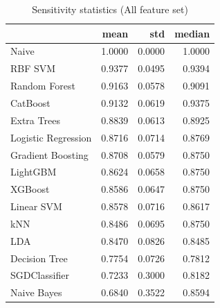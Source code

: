 \begin{table}
\caption{Sensitivity statistics (All feature set)}
\label{tab:sensitivity_All_stats}
\begin{tabular}{lrrr}
\toprule
 & mean & std & median \\
\midrule
Naive & 1.0000 & 0.0000 & 1.0000 \\
RBF SVM & 0.9377 & 0.0495 & 0.9394 \\
Random Forest & 0.9163 & 0.0578 & 0.9091 \\
CatBoost & 0.9132 & 0.0619 & 0.9375 \\
Extra Trees & 0.8839 & 0.0613 & 0.8925 \\
Logistic Regression & 0.8716 & 0.0714 & 0.8769 \\
Gradient Boosting & 0.8708 & 0.0579 & 0.8750 \\
LightGBM & 0.8624 & 0.0658 & 0.8750 \\
XGBoost & 0.8586 & 0.0647 & 0.8750 \\
Linear SVM & 0.8578 & 0.0716 & 0.8617 \\
kNN & 0.8486 & 0.0695 & 0.8750 \\
LDA & 0.8470 & 0.0826 & 0.8485 \\
Decision Tree & 0.7754 & 0.0726 & 0.7812 \\
SGDClassifier & 0.7233 & 0.3000 & 0.8182 \\
Naive Bayes & 0.6840 & 0.3522 & 0.8594 \\
\bottomrule
\end{tabular}
\end{table}
